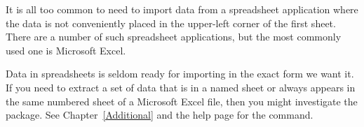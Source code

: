  It is all too common to need to import data from a spreadsheet application where the data is not conveniently placed in the upper-left corner of the first sheet. There are a number of such spreadsheet applications, but the most commonly used one is Microsoft Excel.

Data in spreadsheets is seldom ready for importing in the exact form we want it. If you need to extract a set of data that is in a named sheet or always appears in the same numbered sheet of a Microsoft Excel file, then you might investigate the  package. See Chapter~\ref{Additional} and the help page for the  command.

 


